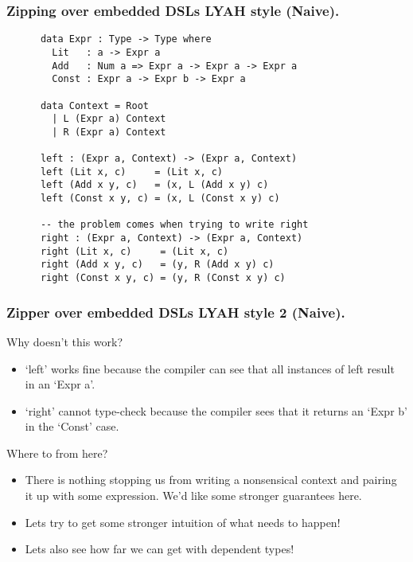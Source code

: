 \documentclass{beamer}
\begin{document}
\begin{frame}[fragile]
  \frametitle{Zipping over embedded DSLs LYAH style (Naive).}
    \begin{verbatim}
      data Expr : Type -> Type where
        Lit   : a -> Expr a
        Add   : Num a => Expr a -> Expr a -> Expr a
        Const : Expr a -> Expr b -> Expr a

      data Context = Root
        | L (Expr a) Context
        | R (Expr a) Context

      left : (Expr a, Context) -> (Expr a, Context)
      left (Lit x, c)     = (Lit x, c)
      left (Add x y, c)   = (x, L (Add x y) c)
      left (Const x y, c) = (x, L (Const x y) c)

      -- the problem comes when trying to write right
      right : (Expr a, Context) -> (Expr a, Context)
      right (Lit x, c)     = (Lit x, c)
      right (Add x y, c)   = (y, R (Add x y) c)
      right (Const x y, c) = (y, R (Const x y) c)
    \end{verbatim}
\end{frame}

\begin{frame}[fragile]
  \frametitle{Zipper over embedded DSLs LYAH style 2 (Naive).}
  \begin{block}{Why doesn't this work?}
    \begin{itemize}
      \item `left' works fine because the compiler can see
        that all instances of left result in an `Expr a'.
      \item `right' cannot type-check because the compiler
        sees that it returns an `Expr b' in the `Const' case.
    \end{itemize}
  \end{block}
  \begin{block}{Where to from here?}
    \begin{itemize}
      \item There is nothing stopping us from writing a nonsensical
        context and pairing it up with some expression. We'd like 
        some stronger guarantees here.
      \item Lets try to get some stronger intuition of what needs to happen!
      \item Lets also see how far we can get with dependent types!
    \end{itemize}
  \end{block}
\end{frame}
\end{document}
